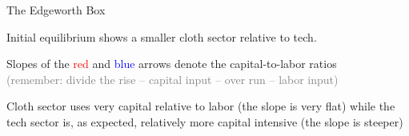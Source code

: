 \documentclass[notes,11pt, aspectratio=169, xcolor=table]{beamer}
\newenvironment{wideitemize}{\itemize\addtolength{\itemsep}{10pt}}{\enditemize}
\begin{document}
\begin{frame}{The Edgeworth Box}

\begin{wideitemize}
    \item Initial equilibrium shows a smaller
cloth sector relative to tech.
    \item Slopes of the \textcolor{red}{red} and \textcolor{blue}{blue} arrows denote the capital-to-labor ratios \\
    \qquad \textcolor{gray}{(remember: divide the rise – capital input – over run – labor input)}
    \item Cloth sector uses very capital relative to labor (the slope is very flat) while the tech sector is, as expected, relatively more capital intensive (the slope is steeper)
\end{wideitemize}


\end{frame}
\end{document}
